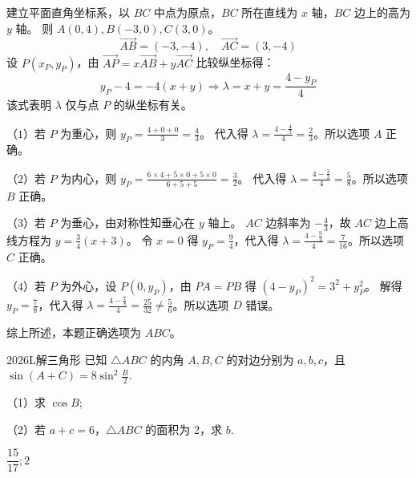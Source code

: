 \documentclass[12pt,UTF-8,a4paper]{ctexart}
\numberwithin{figure}{section}
\theoremstyle{mystyle}
\theoremstyle{mystylekaishu}
\theoremstyle{mystyle}
\numberwithin{xiti}{section}
\begin{document}
\begin{solutions}
建立平面直角坐标系，以 $BC$ 中点为原点，$BC$ 所在直线为 $x$ 轴，$BC$ 边上的高为 $y$ 轴。
则 $A(0,4), B(-3,0), C(3,0)$。
$$
\overrightarrow{AB}=(-3,-4), \quad \overrightarrow{AC}=(3,-4)
$$
设 $P(x_P,y_P)$，由 $\overrightarrow{AP}=x \overrightarrow{AB}+y \overrightarrow{AC}$ 比较纵坐标得：
$$
y_P-4=-4(x+y) \Rightarrow \lambda=x+y=\frac{4-y_P}{4}
$$
该式表明 $\lambda$ 仅与点 $P$ 的纵坐标有关。

（$1$）若 $P$ 为重心，则 $y_P=\displaystyle\frac{4+0+0}{3}=\displaystyle\frac{4}{3}$。
代入得 $\lambda=\displaystyle\frac{4-\frac{4}{3}}{4}=\displaystyle\frac{2}{3}$。所以选项 $A$ 正确。

（$2$）若 $P$ 为内心，则 $y_P=\displaystyle\frac{6\times 4+5\times 0+5\times 0}{6+5+5}=\displaystyle\frac{3}{2}$。
代入得 $\lambda=\displaystyle\frac{4-\frac{3}{2}}{4}=\displaystyle\frac{5}{8}$。所以选项 $B$ 正确。

（$3$）若 $P$ 为垂心，由对称性知垂心在 $y$ 轴上。
$AC$ 边斜率为 $-\displaystyle\frac{4}{3}$，故 $AC$ 边上高线方程为 $y=\displaystyle\frac{3}{4}(x+3)$。
令 $x=0$ 得 $y_P=\displaystyle\frac{9}{4}$，代入得 $\lambda=\displaystyle\frac{4-\frac{9}{4}}{4}=\displaystyle\frac{7}{16}$。所以选项 $C$ 正确。

（$4$）若 $P$ 为外心，设 $P(0,y_P)$，由 $PA=PB$ 得 $(4-y_P)^2=3^2+y_P^2$。
解得 $y_P=\displaystyle\frac{7}{8}$，代入得 $\lambda=\displaystyle\frac{4-\frac{7}{8}}{4}=\displaystyle\frac{25}{32}\neq\displaystyle\frac{5}{6}$。所以选项 $D$ 错误。

综上所述，本题正确选项为 $ABC$。
\end{solutions}


\begin{problem}{2026}{L}{}{}{解三角形}
已知 $\triangle ABC$ 的内角 $A, B, C$ 的对边分别为 $a, b, c$，且 $\sin(A+C)=8\sin^2\frac{B}{2}$.

（1）求 $\cos B$;

（2）若 $a+c=6$，$\triangle ABC$ 的面积为 2，求 $b$.
\end{problem}

\begin{answer}
$\displaystyle\dfrac{15}{17}; 2$
\end{answer}
\end{document}
